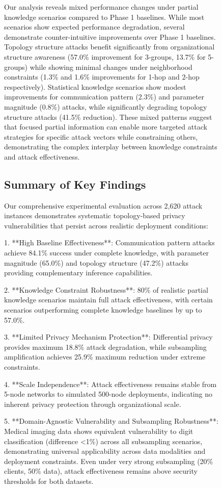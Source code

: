 \begin{figure}[!t]
Our analysis reveals mixed performance changes under partial knowledge scenarios compared to Phase 1 baselines. While most scenarios show expected performance degradation, several demonstrate counter-intuitive improvements over Phase 1 baselines. Topology structure attacks benefit significantly from organizational structure awareness (57.0\% improvement for 3-groups, 13.7\% for 5-groups) while showing minimal changes under neighborhood constraints (1.3\% and 1.6\% improvements for 1-hop and 2-hop respectively). Statistical knowledge scenarios show modest improvements for communication pattern (2.3\%) and parameter magnitude (0.8\%) attacks, while significantly degrading topology structure attacks (41.5\% reduction). These mixed patterns suggest that focused partial information can enable more targeted attack strategies for specific attack vectors while constraining others, demonstrating the complex interplay between knowledge constraints and attack effectiveness.

\subsection{Summary of Key Findings}

Our comprehensive experimental evaluation across 2,620 attack instances demonstrates systematic topology-based privacy vulnerabilities that persist across realistic deployment conditions:

1. **High Baseline Effectiveness**: Communication pattern attacks achieve 84.1\% success under complete knowledge, with parameter magnitude (65.0\%) and topology structure (47.2\%) attacks providing complementary inference capabilities.

2. **Knowledge Constraint Robustness**: 80\% of realistic partial knowledge scenarios maintain full attack effectiveness, with certain scenarios outperforming complete knowledge baselines by up to 57.0\%.

3. **Limited Privacy Mechanism Protection**: Differential privacy provides maximum 18.8\% attack degradation, while subsampling amplification achieves 25.9\% maximum reduction under extreme constraints.

4. **Scale Independence**: Attack effectiveness remains stable from 5-node networks to simulated 500-node deployments, indicating no inherent privacy protection through organizational scale.

5. **Domain-Agnostic Vulnerability and Subsampling Robustness**: Medical imaging data shows equivalent vulnerability to digit classification (difference <1\%) across all subsampling scenarios, demonstrating universal applicability across data modalities and deployment constraints. Even under very strong subsampling (20\% clients, 50\% data), attack effectiveness remains above security thresholds for both datasets.


\end{figure}
